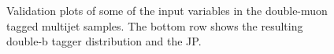 \begin{figure}
 \\
 \\
\caption{Validation plots of some of the input variables in the double-muon tagged multijet samples. The bottom row shows the resulting double-b tagger distribution and the JP.}
\label{fig:doublebdata_1}
\end{figure}

